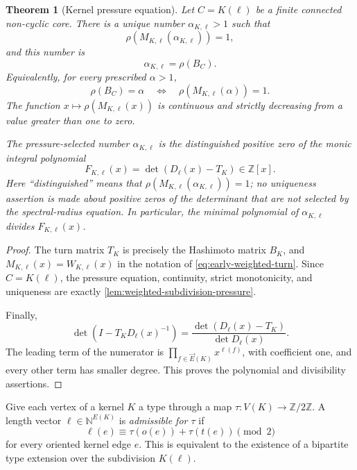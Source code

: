 \documentclass[11pt]{amsart}
\theoremstyle{plain}
\newtheorem{theorem}{Theorem}[section]
\theoremstyle{definition}
\theoremstyle{remark}
\newcommand{\ZZ}{\mathbb Z}
\begin{document}
\begin{theorem}[Kernel pressure equation]\label{thm:kernel-pressure}
Let \(C=K(\ell)\) be a finite connected non-cyclic core.  There is a unique
number \(\alpha_{K,\ell}>1\) such that
\begin{equation}\label{eq:kernel-pressure-defined}
  \rho\!\left(M_{K,\ell}(\alpha_{K,\ell})\right)=1,
\end{equation}
and this number is
\[
  \alpha_{K,\ell}=\rho(B_C).
\]
Equivalently, for every prescribed \(\alpha>1\),
\begin{equation}\label{eq:kernel-pressure}
  \rho(B_C)=\alpha
  \quad\Longleftrightarrow\quad
  \rho\!\left(M_{K,\ell}(\alpha)\right)=1.
\end{equation}
The function \(x\mapsto\rho(M_{K,\ell}(x))\) is continuous and strictly
decreasing from a value greater than one to zero.

The pressure-selected number \(\alpha_{K,\ell}\) is the distinguished
positive zero of the monic integral polynomial
\begin{equation}\label{eq:kernel-polynomial}
  F_{K,\ell}(x)
  =\det\!\left(D_\ell(x)-T_K\right)\in\ZZ[x].
\end{equation}
Here ``distinguished'' means that
\(\rho(M_{K,\ell}(\alpha_{K,\ell}))=1\); no uniqueness assertion is made
about positive zeros of the determinant that are not selected by the
spectral-radius equation.  In particular, the minimal polynomial of
\(\alpha_{K,\ell}\) divides
\(F_{K,\ell}(x)\).
\end{theorem}

\begin{proof}
The turn matrix \(T_K\) is precisely the Hashimoto matrix \(B_K\), and
\(M_{K,\ell}(x)=W_{K,\ell}(x)\) in the notation of
\eqref{eq:early-weighted-turn}.  Since \(C=K(\ell)\), the pressure equation,
continuity, strict monotonicity, and uniqueness are exactly
\cref{lem:weighted-subdivision-pressure}.

Finally,
\[
  \det(I-T_KD_\ell(x)^{-1})
  =\frac{\det(D_\ell(x)-T_K)}{\det D_\ell(x)}.
\]
The leading term of the numerator is
\(\prod_{f\in\vec E(K)}x^{\ell(f)}\), with coefficient one, and every other
term has smaller degree.  This proves the polynomial and divisibility
assertions.
\end{proof}

Give each vertex of a kernel \(K\) a type through a map
\(\tau:V(K)\to\mathbb Z/2\mathbb Z\).  A length vector
\(\ell\in\mathbb N^{E(K)}\) is \emph{admissible for \(\tau\)} if
\begin{equation}\label{eq:kernel-parity}
  \ell(e)\equiv\tau(o(e))+\tau(t(e))\pmod2
\end{equation}
for every oriented kernel edge \(e\).  This is equivalent to the existence
of a bipartite type extension over the subdivision \(K(\ell)\).
\end{document}
